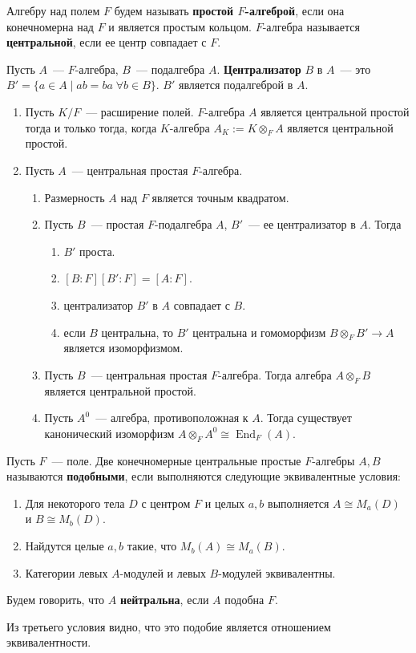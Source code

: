 \documentclass[a4paper,oneside,12pt]{article}
\theoremstyle{plain} { \swapnumbers
\newtheorem{theorem}{Теорема}[subsection]
\newtheorem{corollary}[theorem]{Следствие}
\newtheorem{lemma}[theorem]{Лемма}
\newtheorem{proposition}[theorem]{Утверждение}
\newtheorem{claim}[theorem]{Факт}
}
\theoremstyle{definition} { \swapnumbers
\newtheorem{definition}[theorem]{Определение}
\newtheorem{notation}[theorem]{Обозначение}
\newtheorem{remark}[theorem]{Замечание}
\newtheorem{remarks}[theorem]{Замечания}
\newtheorem{example}[theorem]{Пример}
\newtheorem{examples}[theorem]{Примеры}
\newtheorem{sssection}[theorem]{}
}
\def\End{\operatorname{End}}
\begin{document}
\begin{definition}
Алгебру над полем $F$ будем называть {\bf простой $F$-алгеброй}, если она конечномерна
над $F$ и является простым кольцом. $F$-алгебра называется {\bf центральной},
если ее центр совпадает с $F$.
\end{definition}
\begin{definition}
Пусть $A$~--- $F$-алгебра, $B$~--- подалгебра $A$. {\bf Централизатор} $B$ в $A$~---
это $B'=\{a\in A\mid ab=ba\;\forall b\in B\}$. $B'$ является подалгеброй в $A$.
\end{definition}
\begin{theorem}
\begin{enumerate}
\item Пусть $K/F$~--- расширение полей. $F$-алгебра $A$ является центральной простой тогда и
только тогда, когда $K$-алгебра $A_K:=K\otimes_F A$ является центральной простой.
\item Пусть $A$~--- центральная простая $F$-алгебра.
\begin{enumerate}
\item Размерность $A$ над $F$ является точным квадратом.
\item Пусть $B$~--- простая $F$-подалгебра $A$, $B'$~--- ее централизатор в $A$. Тогда
\begin{enumerate}
\item $B'$ проста.
\item $[B:F][B':F]=[A:F]$.
\item централизатор $B'$ в $A$ совпадает с $B$.
\item если $B$ центральна, то $B'$ центральна и гомоморфизм $B\otimes_F B'\to A$ является изоморфизмом.
\end{enumerate}
\item Пусть $B$~--- центральная простая $F$-алгебра. Тогда алгебра $A\otimes_F B$ является
центральной простой.
\item Пусть $A^0$~--- алгебра, противоположная к $A$. Тогда существует канонический изоморфизм
$A\otimes_F A^0\cong\End_F(A)$.
\end{enumerate}
\end{enumerate}
\end{theorem}


\begin{definition}
Пусть $F$~--- поле. Две конечномерные центральные простые $F$-алгебры $A,B$ называются {\bf подобными},
если выполняются следующие эквивалентные условия:
\begin{enumerate}
\item Для некоторого тела $D$ с центром $F$ и целых $a,b$ выполняется $A\cong M_a(D)$ и $B\cong M_b(D)$.
\item Найдутся целые $a,b$ такие, что $M_b(A)\cong M_a(B)$.
\item Категории левых $A$-модулей и левых $B$-модулей эквивалентны.
\end{enumerate}
Будем говорить, что $A$ {\bf нейтральна}, если $A$ подобна $F$.
\end{definition}
Из третьего условия видно, что это подобие является отношением эквивалентности.
\end{document}
